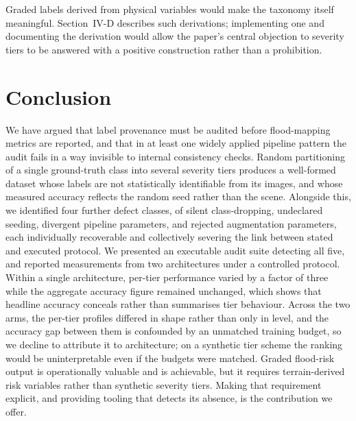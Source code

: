 \documentclass[11pt,journal]{IEEEtran}
\begin{document}
Graded labels derived from physical variables would make the taxonomy itself
meaningful. Section~IV-D describes such derivations; implementing one and
documenting the derivation would allow the paper's central objection to severity
tiers to be answered with a positive construction rather than a prohibition.

\section{Conclusion}

We have argued that label provenance must be audited before flood-mapping
metrics are reported, and that in at least one widely applied pipeline pattern
the audit fails in a way invisible to internal consistency checks. Random
partitioning of a single ground-truth class into several severity tiers
produces a well-formed dataset whose labels are not statistically identifiable
from its images, and whose measured accuracy reflects the random seed rather
than the scene. Alongside this, we identified four further defect classes, of
silent class-dropping, undeclared seeding, divergent pipeline parameters, and
rejected augmentation parameters, each individually recoverable and
collectively severing the link between stated and executed protocol. We
presented an executable audit suite detecting all five, and reported
measurements from two architectures under a controlled protocol. Within a
single architecture, per-tier performance varied by a factor of three while the
aggregate accuracy figure remained unchanged, which shows that headline
accuracy conceals rather than summarises tier behaviour. Across the two arms,
the per-tier profiles differed in shape rather than only in level, and the
accuracy gap between them is confounded by an unmatched training budget, so we
decline to attribute it to architecture; on a synthetic tier scheme the ranking
would be uninterpretable even if the budgets were matched. Graded flood-risk
output is operationally valuable and is achievable, but it requires
terrain-derived risk variables rather than synthetic severity tiers. Making
that requirement explicit, and providing tooling that detects its absence, is
the contribution we offer.
\end{document}
